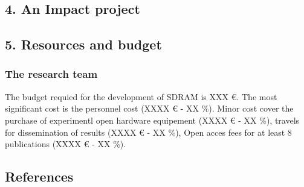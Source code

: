 \documentclass[
  11pt,
  a4paperpaper,
  onecolumn]{article}
\begin{document}
\hypertarget{an-impact-project}{%
\subsection{4. An Impact project}\label{an-impact-project}}

\hypertarget{resources-and-budget}{%
\subsection{5. Resources and budget}\label{resources-and-budget}}

\hypertarget{the-research-team}{%
\subsubsection{The research team}\label{the-research-team}}

The budget requied for the development of SDRAM is XXX €. The most
significant cost is the personnel cost (XXXX € - XX \%). Minor cost
cover the purchase of experimentl open hardware equipement (XXXX € - XX
\%), travels for dissemination of results (XXXX € - XX \%), Open acces
fees for at least 8 publications (XXXX € - XX \%).

\newpage

\hypertarget{references}{%
\subsection*{References}\label{references}}
\end{document}
